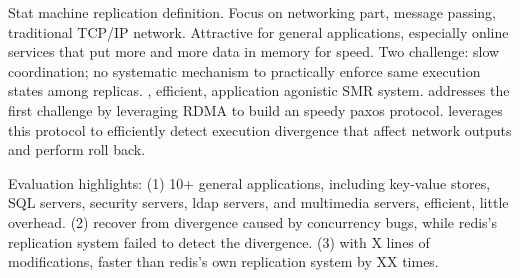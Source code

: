 Stat machine replication definition. Focus on networking part, message passing, 
traditional TCP/IP network. Attractive for general applications, especially 
online services that put more and more data in memory for speed. Two challenge: 
slow coordination; no systematic mechanism to practically enforce same 
execution states among replicas. \xxx, efficient, application agonistic SMR 
system. \xxx addresses the first challenge by leveraging RDMA to build an 
speedy paxos protocol. \xxx leverages this protocol to efficiently detect 
execution divergence that affect network outputs and perform roll back. 

Evaluation highlights: (1) 10+ general applications, including key-value 
stores, SQL servers, security servers, ldap servers, and multimedia servers, 
efficient, little overhead. (2) recover from divergence caused by concurrency 
bugs, while redis's replication system failed to detect the divergence. (3) 
with X lines of modifications, faster than redis's own replication system by XX 
times. 
